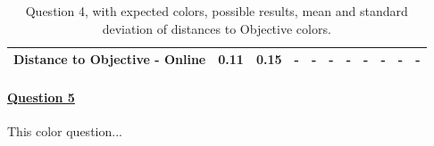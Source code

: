 \begin{table}[H]
{\begin{tabular}{lccccccccccccc}
    \multicolumn{4}{l}{Distance to Objective - Online}                                                                                               & \multicolumn{1}{|c}{0.11}       & \multicolumn{1}{c|}{0.15}    & \multicolumn{1}{|c}{-}       & \multicolumn{1}{c|}{-}    & \multicolumn{1}{|c}{-}         & \multicolumn{1}{c|}{-}    & \multicolumn{1}{|c}{-}        & \multicolumn{1}{c|}{-}    & \multicolumn{1}{|c}{-}       & \multicolumn{1}{c|}{-}    \\ \hline
    \end{tabular}}
  \caption[Question 4, with expected Results.]{Question 4, with expected colors, possible results, mean and standard deviation of distances to Objective colors.}
  \label{table:lab_q4_expected}
\end{table}
%
\paragraph{\ul{Question 5}}
%
This color question...
%
